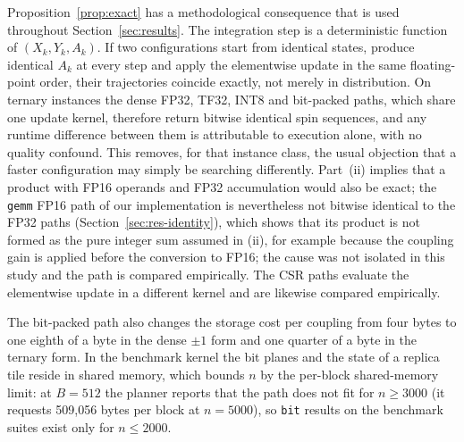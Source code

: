 \documentclass[11pt,a4paper]{article}
\newcommand{\code}[1]{\texttt{#1}}
\begin{document}
Proposition~\ref{prop:exact} has a methodological consequence that is used throughout Section~\ref{sec:results}. The integration step is a deterministic function of $(X_k,Y_k,A_k)$. If two configurations start from identical states, produce identical $A_k$ at every step and apply the elementwise update in the same floating-point order, their trajectories coincide exactly, not merely in distribution. On ternary instances the dense FP32, TF32, INT8 and bit-packed paths, which share one update kernel, therefore return bitwise identical spin sequences, and any runtime difference between them is attributable to execution alone, with no quality confound. This removes, for that instance class, the usual objection that a faster configuration may simply be searching differently. Part~(ii) implies that a product with FP16 operands and FP32 accumulation would also be exact; the \code{gemm} FP16 path of our implementation is nevertheless not bitwise identical to the FP32 paths (Section~\ref{sec:res-identity}), which shows that its product is not formed as the pure integer sum assumed in (ii), for example because the coupling gain is applied before the conversion to FP16; the cause was not isolated in this study and the path is compared empirically. The CSR paths evaluate the elementwise update in a different kernel and are likewise compared empirically.

The bit-packed path also changes the storage cost per coupling from four bytes to one eighth of a byte in the dense $\pm1$ form and one quarter of a byte in the ternary form. In the benchmark kernel the bit planes and the state of a replica tile reside in shared memory, which bounds $n$ by the per-block shared-memory limit: at $B=512$ the planner reports that the path does not fit for $n\ge 3000$ (it requests 509,056 bytes per block at $n=5000$), so \code{bit} results on the benchmark suites exist only for $n\le 2000$.
\end{document}
